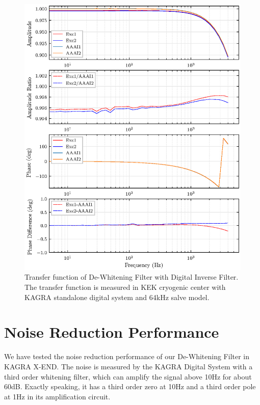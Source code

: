 \begin{figure}[bt!]
\centering
\includegraphics[width=1\textwidth]{figure/tf/TF_KEK_64}
\caption[Transfer function of De-Whitening Filter with Digital Inverse Filter]{Transfer function of De-Whitening Filter with Digital Inverse Filter. The transfer function is measured in KEK cryogenic center with KAGRA standalone digital system and 64kHz salve model.}\label{fig:tf64}
\end{figure}







\pagebreak
\section{Noise Reduction Performance}
We have tested the noise reduction performance of our De-Whitening Filter in KAGRA X-END. The noise is measured by the KAGRA Digital System with a third order whitening filter, which can amplify the signal above 10Hz for about 60dB. Exactly speaking, it has a third order zero at 10Hz and a third order pole at 1Hz in its amplification circuit. 

